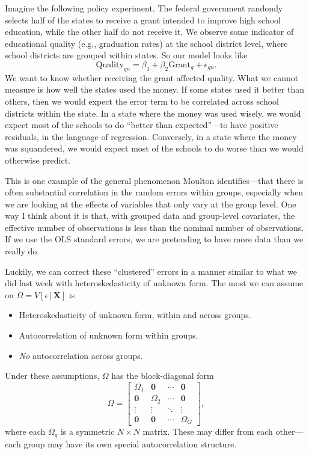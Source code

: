\documentclass[
  12pt,
  oneside,openany]{book}
\begin{document}
Imagine the following policy experiment. The federal government randomly selects half of the states to receive a grant intended to improve high school education, while the other half do not receive it. We observe some indicator of educational quality (e.g., graduation rates) at the school district level, where school districts are grouped within states. So our model looks like
\[
\text{Quality}_{gn} = \beta_1 + \beta_2 \text{Grant}_g + \epsilon_{gn}.
\]
We want to know whether receiving the grant affected quality. What we cannot measure is how well the states used the money. If some states used it better than others, then we would expect the error term to be correlated across school districts within the state. In a state where the money was used wisely, we would expect most of the schools to do ``better than expected''---to have positive residuals, in the language of regression. Conversely, in a state where the money was squandered, we would expect most of the schools to do worse than we would otherwise predict.

This is one example of the general phenomenon Moulton \citetext{\citeyear{Moulton:1986kw}; \citeyear{Moulton:1990bl}} identifies---that there is often substantial correlation in the random errors within groups, especially when we are looking at the effects of variables that only vary at the group level. One way I think about it is that, with grouped data and group-level covariates, the effective number of observations is less than the nominal number of observations. If we use the OLS standard errors, we are pretending to have more data than we really do.

Luckily, we can correct these ``clustered'' errors in a manner similar to what we did last week with heteroskedasticity of unknown form. The most we can assume on \(\Omega = V[\epsilon \,|\, \mathbf{X}]\) is

\begin{itemize}
\item
  Heteroskedasticity of unknown form, within and across groups.
\item
  Autocorrelation of unknown form within groups.
\item
  \emph{No} autocorrelation across groups.
\end{itemize}

Under these assumptions, \(\Omega\) has the block-diagonal form
\[
\Omega = \begin{bmatrix}
  \Omega_1 & \mathbf{0} & \cdots & \mathbf{0} \\
  \mathbf{0} & \Omega_2 & \cdots & \mathbf{0} \\
  \vdots & \vdots & \ddots & \vdots \\
  \mathbf{0} & \mathbf{0} & \cdots & \Omega_G
\end{bmatrix},
\]
where each \(\Omega_g\) is a symmetric \(N \times N\) matrix. These may differ from each other---each group may have its own special autocorrelation structure.
\end{document}
